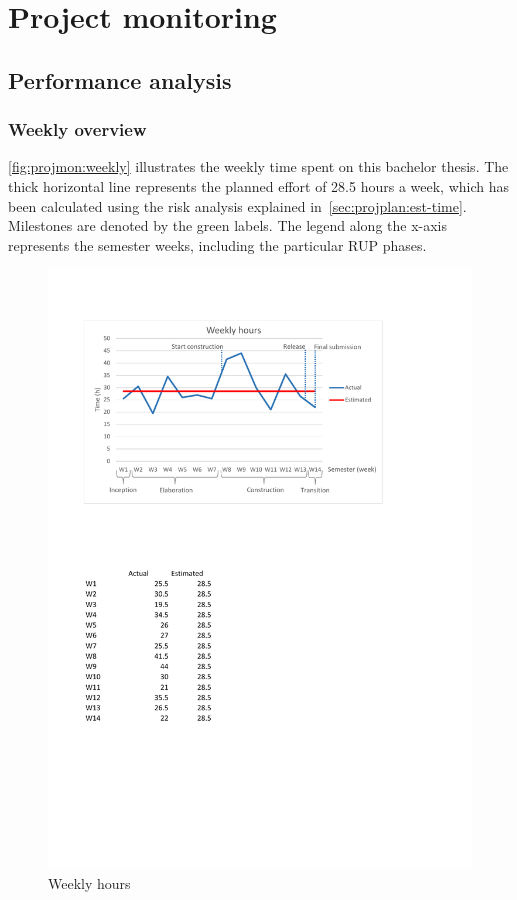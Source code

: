 \chapter{Project monitoring}
\section{Performance analysis}
\subsection{Weekly overview}

\autoref{fig:projmon:weekly} illustrates the weekly time spent on this bachelor
thesis. The thick horizontal line represents the planned effort of 28.5 hours a
week, which has been calculated using the risk analysis explained
in~\autoref{sec:projplan:est-time}.  Milestones are denoted by the green
labels. The legend along the x-axis represents the semester weeks, including
the particular RUP phases.


\begin{figure}[]
	\includegraphics[trim=2cm 18.3cm 4.6cm 2.8cm, clip=true, width=\textwidth]{img/project_monitoring_weekly_hours_diagram.pdf}
	\caption{Weekly hours}
	\label{fig:weekly:hours}
\end{figure}

